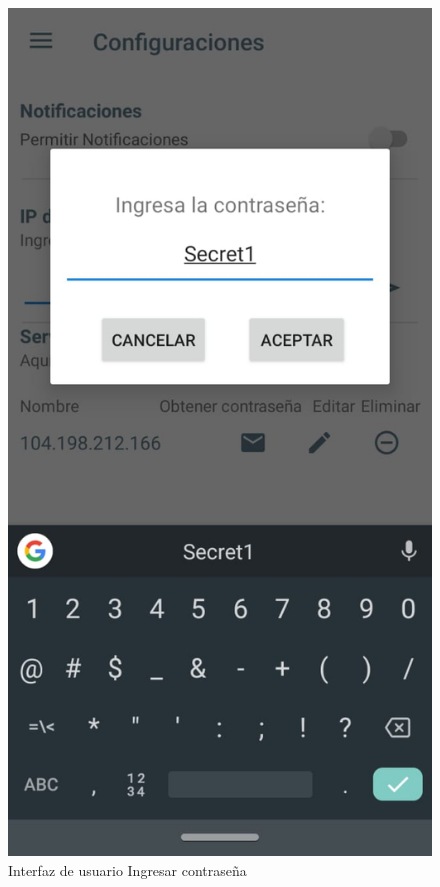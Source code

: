 \begin{figure}[H]
	\centering
	\includegraphics[scale=0.4]{Capitulo4/software/submodulos/images/man10.png}
	\caption{Interfaz de usuario Ingresar contraseña}
	\label{fig:contrasena}
\end{figure}

